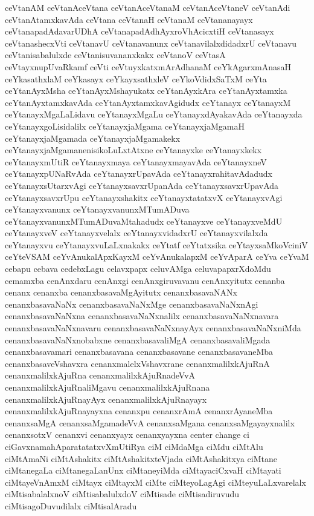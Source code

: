 {ceVtanAM
ceVtanAceVtana
ceVtanAceVtanaM
ceVtanAceVtaneV
ceVtanAdi
ceVtanAtamxkavAda
ceVtana
ceVtanaH
ceVtanaM
ceVtananayayx
ceVtanapadAdavarUDhA
ceVtanapadAdhAyxroVhAcicxtiH
ceVtanasayx
ceVtanashecxVti
ceVtanavU
ceVtanavanunx
ceVtanavilalxdidadxrU
ceVtanavu
ceVtanisabalulxde
ceVtanisuvananxkakx
ceVtanoV
ceVtasA
ceVtayxnupUvaRkamf
ceVti
ceVtuyxkatxmArAdhanaM
ceYkAgarxmAnasaH
ceYkasathxlaM
ceYkasayx
ceYkayxsathxleV
ceYkoVdidxSaTxM
ceYta
ceYtanAyxMsha
ceYtanAyxMshayukatx
ceYtanAyxkAra
ceYtanAyxtamxka
ceYtanAyxtamxkavAda
ceYtanAyxtamxkavAgidudx
ceYtanayx
ceYtanayxM
ceYtanayxMgaLaLidavu
ceYtanayxMgaLu
ceYtanayxdAyakavAda
ceYtanayxda
ceYtanayxgoLisidalilx
ceYtanayxjaMgama
ceYtanayxjaMgamaH
ceYtanayxjaMgamada
ceYtanayxjaMgamakekx
ceYtanayxjaMgamanenisikoLuLxtAtxne
ceYtanayxke
ceYtanayxkekx
ceYtanayxmUtiR
ceYtanayxmaya
ceYtanayxmayavAda
ceYtanayxneV
ceYtanayxpUNaRvAda
ceYtanayxrUpavAda
ceYtanayxrahitavAdadudx
ceYtanayxsUtarxvAgi
ceYtanayxsavxrUpanAda
ceYtanayxsavxrUpavAda
ceYtanayxsavxrUpu
ceYtanayxshakitx
ceYtanayxtatatxvX
ceYtanayxvAgi
ceYtanayxvanunx
ceYtanayxvanunxMTumADuva
ceYtanayxvanunxMTumADuvaMtahadudx
ceYtanayxve
ceYtanayxveMdU
ceYtanayxveV
ceYtanayxvelalx
ceYtanayxvidadxrU
ceYtanayxvilalxda
ceYtanayxvu
ceYtanayxvuLaLxnakakx
ceYtatf
ceYtatxsika
ceYtayxsaMkoVciniV
ceYteVSAM
ceYvAnukalApxKayxM
ceYvAnukalapxM
ceYvAparA
ceYva
ceYvaM
cebapu
cebava
cedebxLagu
celavxpapx
celuvAMga
celuvapapxrXdoMdu
cemamxba
cenAnxdaru
cenAnxgi
cenAnxgiruvavanu
cenAnxyitutx
cenanba
cenanx
cenanxba
cenanxbasavaMgAyitutx
cenanxbasavaNANx
cenanxbasavaNaNx
cenanxbasavaNaNxMge
cenanxbasavaNaNxnAgi
cenanxbasavaNaNxna
cenanxbasavaNaNxnalilx
cenanxbasavaNaNxnavara
cenanxbasavaNaNxnavaru
cenanxbasavaNaNxnayAyx
cenanxbasavaNaNxniMda
cenanxbasavaNaNxnobabxne
cenanxbasavaliMgA
cenanxbasavaliMgada
cenanxbasavamari
cenanxbasavana
cenanxbasavane
cenanxbasavaneMba
cenanxbasaveVshavxra
cenanxmalelxVshavxrane
cenanxmalilxkAjuRnA
cenanxmalilxkAjuRna
cenanxmalilxkAjuRnadeVvA
cenanxmalilxkAjuRnaliMgavu
cenanxmalilxkAjuRnana
cenanxmalilxkAjuRnayAyx
cenanxmalilxkAjuRnayayx
cenanxmalilxkAjuRnayayxna
cenanxpu
cenanxrAmA
cenanxrAyaneMba
cenanxsaMgA
cenanxsaMgamadeVvA
cenanxsaMgana
cenanxsaMgayayxnalilx
cenanxsotxV
cenanxvi
cenanxyayx
cenanxyayxna
center
change
ci
ciGavxnamahAparatatatxvXmUtiRya
ciM
ciMdaMga
ciMdu
ciMtAlu
ciMtAmaNi
ciMtAshakitx
ciMtAshakitxteVjada
ciMtAshakitxya
ciMtane
ciMtanegaLa
ciMtanegaLanUnx
ciMtaneyiMda
ciMtayaciCxvaH
ciMtayati
ciMtayeVnAmxM
ciMtayx
ciMtayxM
ciMte
ciMteyoLagAgi
ciMteyuLaLxvarelalx
ciMtisabalalxnoV
ciMtisabalulxdoV
ciMtisade
ciMtisadiruvudu
ciMtisagoDuvudilalx
ciMtisalAradu
}

